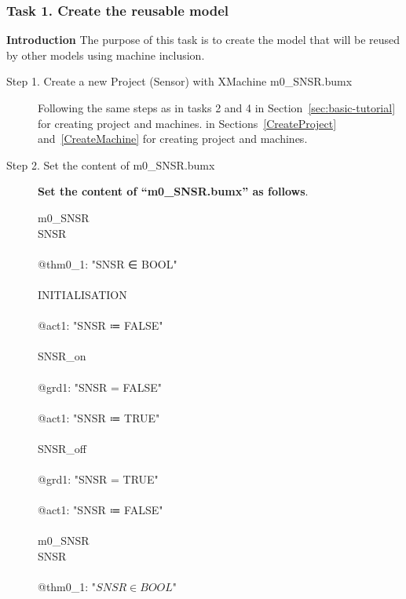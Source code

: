 \subsubsection{Task 1. Create the reusable model}
\textbf{Introduction} The purpose of this task is to create the model that will be reused by other models using machine inclusion.
\begin{description}
\item[Step 1. Create a new Project (Sensor) with XMachine m0\_SNSR.bumx] 

Following the same steps as 
\ifplastex
in tasks 2 and 4 in Section~\ref{sec:basic-tutorial} for creating project and machines.
\else
in Sections~\ref{CreateProject} and~\ref{CreateMachine} for creating project and machines.
\fi

\item[Step 2. Set the content of m0\_SNSR.bumx] \textbf{Set the content of ``m0\_SNSR.bumx'' as follows}.
\begin{center}
	\begin{Bcode}
		\ifplastex
		\Bmachine{} m0_SNSR\\
		\Bvariables{} SNSR\\
		\Binvariants\\
		@thm0_1: "SNSR ∈ BOOL" \Btheorem\\
		\Bevents\\
		INITIALISATION\\
		\Bbegin\\
		@act1: "SNSR ≔ FALSE"\\
		\Bend\\
		SNSR_on\\
		\Bwhen\\
		@grd1: "SNSR = FALSE"\\
		\Bthen\\
		@act1: "SNSR ≔ TRUE"\\
		\Bend\\
	    SNSR_off\\
	    \Bwhen\\
	    @grd1: "SNSR = TRUE"\\
	    \Bthen\\
	    @act1: "SNSR ≔ FALSE"\\
	    \Bend\\
		\Bend
		\else
		\Bmachine{} m0_SNSR\\
		\Bvariables{} SNSR\\
		\Binvariants\\
		\Btab @thm0_1: "\(SNSR \in BOOL\)" \Btheorem\\

\end{Bcode}
\end{center}
\end{description}
